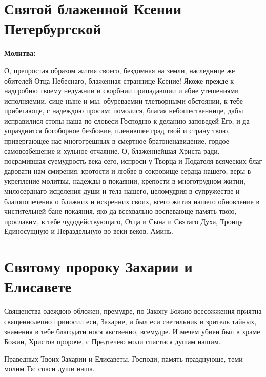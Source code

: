 \section{Святой блаженной Ксении Петербургской}
 
\bfseries Молитва:\normalfont{}


О, препростая образом жития своего, бездомная на земли, наследнице же обителей Отца Небеснаго, блаженная страннице Ксение! Якоже прежде к надгробию твоему недужнии и скорбнии припадавшии и абие утешениями исполняемии, сице ныне и мы, обуреваемии тлетворными обстоянии, к тебе прибегающе, с надеждою просим: помолися, благая небошественнице, дабы исправилися стопы наша по словеси Господню к деланию заповедей Его, и да упразднится богоборное безбожие, пленившее град твой и страну твою, привергающее нас многогрешных в смертное братоненавидение, гордое самовозбешение и хульное отчаяние. О, блаженнейшая Христа ради, посрамившая суемудрость века сего, испроси у Творца и Подателя всяческих благ даровати нам смирения, кротости и любве в сокровище сердца нашего, веры в укрепление молитвы, надежды в покаянии, крепости в многотрудном житии, милосерднаго исцеления души и тела нашего, целомудрия в супружестве и благопопечения о ближних и искренних своих, всего жития нашего обновление в чистительней бане покаяния, яко да всехвально воспевающе память твою, прославим, в тебе чудодействующаго, Отца и Сына и Святаго Духа, Троицу Единосущную и Нераздельную во веки веков. Аминь.\mychapterending


 

\section{Святому пророку Захарии и Елисавете}
 


Священства одеждою обложен, премудре, по Закону Божию всесожжения приятна священнолепно приносил еси, Захарие, и был еси светильник и зритель тайных, знамения в тебе благодати нося явственно, всемудре. И мечем убиен был в храме Божии, Христов пророче, с Предтечею моли спастися душам нашим.




Праведных Твоих Захарии и Елисаветы, Господи, память празднующе, теми молим Тя: спаси души наша.


